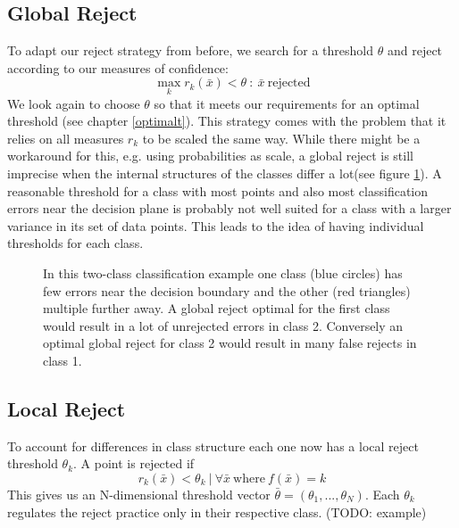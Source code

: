 \subsection{Global Reject}
To adapt our reject strategy from before, we search for a threshold $\theta$ and reject according to our measures of confidence:
$$ \operatorname*{max}_k r_k(\bar{x}) < \theta \ : \ \bar{x} \ \text{rejected}  $$
We look again to choose $\theta$ so that it meets our requirements for an optimal threshold (see chapter \ref{optimalt}). This strategy comes with the problem that it relies on all measures $r_k$ to be scaled the same way. While there might be a workaround for this, e.g. using probabilities as scale, a global reject is still imprecise when the internal structures of the classes differ a lot(see figure \ref{classStructure}). A reasonable threshold for a class with most points and also most classification errors near the decision plane is probably not well suited for a class with a larger variance in its set of data points. This leads to the idea of having individual thresholds for each class.

\begin{figure}[!htbp]
\centering
\caption{In this two-class classification example one class (blue circles) has few errors near the decision boundary and the other (red triangles) multiple further away. A global reject optimal for the first class would result in a lot of unrejected errors in class 2. Conversely an optimal global reject for class 2 would result in many false rejects in class 1.}
\label{classStructure}
\end{figure}

\subsection{Local Reject}
\label{localreject}
To account for differences in class structure each one now has a local reject threshold $\theta_k$. A point is rejected if
$$ r_k(\bar{x}) < \theta_k \ | \ \forall \bar{x} \  \text{where} \ f(\bar{x}) = k $$
This gives us an N-dimensional threshold vector $\bar{\theta} = (\theta_1,...,\theta_N)$. Each $\theta_k$ regulates the reject practice only in their respective class. (TODO: example)

